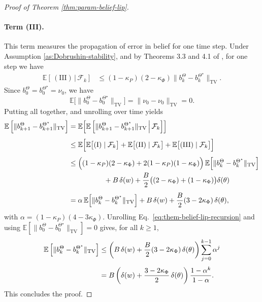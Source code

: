\documentclass[10pt]{article} %
\theoremstyle{plain}
\theoremstyle{definition}
\theoremstyle{remark}
\newcommand{\bE}{\mathbb{E}}
\begin{document}
\begin{proof}[Proof of Theorem \ref{thm:param-belief-lip}]
\paragraph{Term (III).} This term measures the propagation of error in belief for one time step. Under Assumption \ref{as:Dobrushin-stability}, and by Theorems 3.3 and 4.1 of \cite{Mcdonald2024StochasticCriteria}, for one step we have
\begin{align}\label{eq:one-step-ex-bound}
 \bE[\,\mathrm{(III)}\,|\, \mathcal{F}_k]&\le(1-\kappa_P)(2-\kappa_\Phi)\|b^\Theta_k-b_k^{\Theta^\star}\|_{\mathrm{TV}}.
\end{align}
Since \(b_0^\Theta=b_0^{\Theta^\star}=\nu_0\), we have
\[
\bE\Big[\|b_{0}^\Theta-b_{0}^{\Theta^\star}\|_{\mathrm{TV}}\Big]
=\|\nu_0-\nu_0\|_{\mathrm{TV}}=0.
\]
Putting all together, and unrolling over time yields
\begin{align}\label{eq:them-belief-lip-recursion}
\bE\,\Big[\|b_{k+1}^\Theta-b_{k+1}^{\Theta^\star}\|_{\mathrm{TV}}\Big]
&= \bE\Bigl[\bE\,\Big[\|b_{k+1}^\Theta-b_{k+1}^{\Theta^\star}\|_{\mathrm{TV}}\,\Big|\,\mathcal{F}_{k}\Big]\Bigr]\notag\\[4pt]
&\le \bE\Big[\bE\big[(\mathrm{I})\mid \mathcal F_k\big]+\bE\big[(\mathrm{II})\mid \mathcal F_k\big]+\bE\big[(\mathrm{III})\mid \mathcal F_k\big]\Big]\notag\\[4pt]
&\le \Big((1-\kappa_P)(2-\kappa_\Phi)+2(1-\kappa_P)(1-\kappa_\Phi)\Big)\,
\bE\Big[\|b_k^\Theta-b_k^{\Theta^\star}\|_{\mathrm{TV}}\Big]\notag\\
&\qquad\qquad\quad
+B\,\delta(w)+\frac{B}{2}\bigl((2-\kappa_\Phi)+(1-\kappa_\Phi)\bigr)\delta(\theta)\notag\\[4pt]
&=\alpha\,
\bE\Big[\|b_k^\Theta-b_k^{\Theta^\star}\|_{\mathrm{TV}}\Big]
+B\,\delta(w)+\frac{B}{2}(3-2\kappa_\Phi)\,\delta(\theta),
\end{align}
with \(\alpha=(1-\kappa_P)(4-3\kappa_\Phi)\). Unrolling Eq.~\ref{eq:them-belief-lip-recursion} and using \(\bE[\|b_0^\Theta-b_0^{\Theta^\star}\|_{\mathrm{TV}}]=0\) gives, for all \(k\ge 1\),
\begin{align}\label{eq:them-belief-lip-unrolled-final}
\bE\,\Big[\|b_{k}^\Theta-b_{k}^{\Theta^\star}\|_{\mathrm{TV}}\Big]
&\le \left(B\,\delta(w)+\frac{B}{2}(3-2\kappa_\Phi)\,\delta(\theta)\right)
\sum_{j=0}^{k-1}\alpha^{j}\notag\\[3pt]
&=
B\left(\delta(w)+\frac{3-2\kappa_\Phi}{2}\,\delta(\theta)\right)
\frac{1-\alpha^{k}}{1-\alpha}.
\end{align}
This concludes the proof.
\end{proof}
\end{document}

